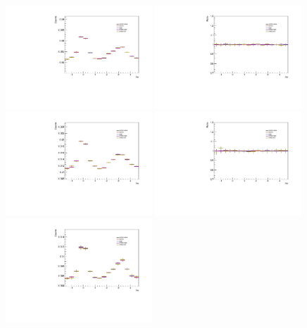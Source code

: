 \begin{figure}[ht]
    \centering
    \includegraphics[width=0.49\textwidth]{figures/analysis/sideband_variations_dphi_0_20_highpt.pdf}
    \includegraphics[width=0.49\textwidth]{figures/analysis/sideband_variations_dphi_0_20_highpt_ratio.pdf}
    \includegraphics[width=0.49\textwidth]{figures/analysis/sideband_variations_dphi_20_50_highpt.pdf}
    \includegraphics[width=0.49\textwidth]{figures/analysis/sideband_variations_dphi_20_50_highpt_ratio.pdf}
    \includegraphics[width=0.49\textwidth]{figures/analysis/sideband_variations_dphi_50_80_highpt.pdf}

\end{figure}
